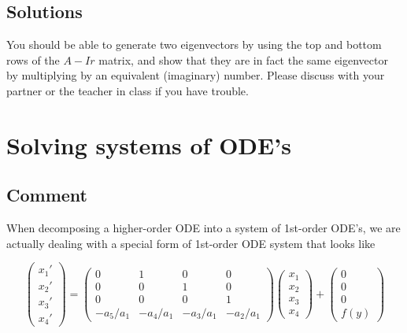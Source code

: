 \subsection*{Solutions}
You should be able to generate two eigenvectors by using the top and bottom rows of the $A-Ir$ matrix, and show that they are in fact the same eigenvector by multiplying by an equivalent (imaginary) number. Please discuss with your partner or the teacher in class if you have trouble.



\newpage
\section{Solving systems of ODE's}
\label{sec:systemsolving}

\subsection*{Comment}
When decomposing a higher-order ODE into a system of 1st-order ODE's, we are actually dealing with a special form of 1st-order ODE system that looks like

\begin{equation}
     \left(
        \begin{array}{c}
            x_1' \\ x_2' \\ x_3' \\ x_4'
        \end{array}
    \right)
    =
     \left(
        \begin{array}{cccc}
            0 & 1 & 0 & 0 \\
            0 & 0 & 1 & 0 \\
            0 & 0 & 0 & 1 \\
            -a_5/a_1 & -a_4/a_1 & -a_3/a_1 & -a_2/a_1
        \end{array}
    \right)
     \left(
        \begin{array}{c}
            x_1 \\ x_2 \\ x_3 \\ x_4
        \end{array}
    \right)
    +
     \left(
        \begin{array}{c}
            0 \\ 0 \\ 0 \\ f(y)
        \end{array}
    \right)
\end{equation}

